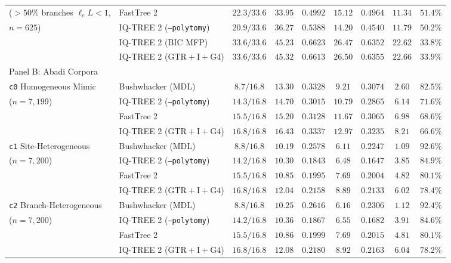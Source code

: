 \documentclass[11pt,a4paper]{article}
\begin{document}
\begin{table}[t!]
{\begin{tabular}{@{}llccccccc@{}}
($>50\%$ branches $\ell_e L < 1$, & FastTree 2 & $22.3 / 33.6$ & $33.95$ & $0.4992$ & $15.12$ & $0.4964$ & $11.34$ & $51.4\%$ \\
$n=625$) & IQ-TREE 2 (\texttt{--polytomy}) & $20.9 / 33.6$ & $36.27$ & $0.5388$ & $14.20$ & $0.4540$ & $11.79$ & $50.2\%$ \\
& IQ-TREE 2 (BIC MFP) & $33.6 / 33.6$ & $45.23$ & $0.6623$ & $26.47$ & $0.6352$ & $22.62$ & $33.8\%$ \\
& IQ-TREE 2 ($\text{GTR}+\text{I}+\text{G4}$) & $33.6 / 33.6$ & $45.32$ & $0.6613$ & $26.50$ & $0.6355$ & $22.66$ & $33.9\%$ \\
\midrule
Panel B: Abadi Corpora & & & & & & & & \\
\texttt{c0} Homogeneous Mimic & Bushwhacker (MDL) & $8.7 / 16.8$ & $13.30$ & $0.3328$ & $9.21$ & $0.3074$ & $2.60$ & $82.5\%$ \\
($n=7,199$) & IQ-TREE 2 (\texttt{--polytomy}) & $14.3 / 16.8$ & $14.70$ & $0.3015$ & $10.79$ & $0.2865$ & $6.14$ & $71.6\%$ \\
& FastTree 2 & $15.5 / 16.8$ & $15.20$ & $0.3128$ & $11.67$ & $0.3065$ & $6.98$ & $68.6\%$ \\
& IQ-TREE 2 ($\text{GTR}+\text{I}+\text{G4}$) & $16.8 / 16.8$ & $16.43$ & $0.3337$ & $12.97$ & $0.3235$ & $8.21$ & $66.6\%$ \\
\addlinespace
\texttt{c1} Site-Heterogeneous & Bushwhacker (MDL) & $8.8 / 16.8$ & $10.19$ & $0.2578$ & $6.11$ & $0.2247$ & $1.09$ & $92.6\%$ \\
($n=7,200$) & IQ-TREE 2 (\texttt{--polytomy}) & $14.2 / 16.8$ & $10.30$ & $0.1843$ & $6.48$ & $0.1647$ & $3.85$ & $84.9\%$ \\
& FastTree 2 & $15.5 / 16.8$ & $10.85$ & $0.1995$ & $7.69$ & $0.2004$ & $4.82$ & $80.1\%$ \\
& IQ-TREE 2 ($\text{GTR}+\text{I}+\text{G4}$) & $16.8 / 16.8$ & $12.04$ & $0.2158$ & $8.89$ & $0.2133$ & $6.02$ & $78.4\%$ \\
\addlinespace
\texttt{c2} Branch-Heterogeneous & Bushwhacker (MDL) & $8.8 / 16.8$ & $10.25$ & $0.2616$ & $6.16$ & $0.2306$ & $1.12$ & $92.4\%$ \\
($n=7,200$) & IQ-TREE 2 (\texttt{--polytomy}) & $14.2 / 16.8$ & $10.36$ & $0.1867$ & $6.55$ & $0.1682$ & $3.91$ & $84.6\%$ \\
& FastTree 2 & $15.5 / 16.8$ & $10.86$ & $0.1999$ & $7.69$ & $0.2015$ & $4.81$ & $80.1\%$ \\
& IQ-TREE 2 ($\text{GTR}+\text{I}+\text{G4}$) & $16.8 / 16.8$ & $12.08$ & $0.2180$ & $8.92$ & $0.2163$ & $6.04$ & $78.2\%$ \\
\bottomrule
\end{tabular}%
}
\end{table}
\end{document}
